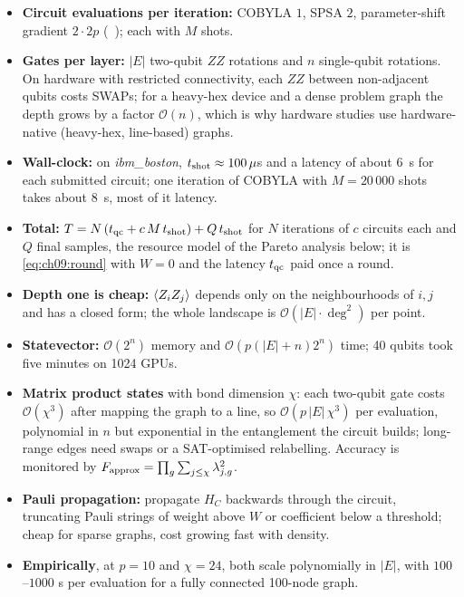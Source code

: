 \documentclass[handoutsbeamer.tex]{subfiles}
\begin{document}
\begin{frame}
\begin{itemize}\setlength\itemsep{0.3em}
    \item \textbf{Circuit evaluations per iteration:} COBYLA $1$, SPSA $2$, parameter-shift gradient $2\cdot 2p$ (\Chap~); each with $M$ shots.
    \item \textbf{Gates per layer:} $|E|$ two-qubit $ZZ$ rotations and $n$ single-qubit rotations. On hardware with restricted connectivity, each $ZZ$ between non-adjacent qubits costs SWAPs; for a heavy-hex device and a dense problem graph the depth grows by a factor $\mathcal O(n)$, which is why hardware studies use hardware-native (heavy-hex, line-based) graphs.
    \item \textbf{Wall-clock:} on \emph{ibm\_boston}, $t_{\rm shot} \approx 100\,\mu$s and a latency of about $6$~s for each submitted circuit; one iteration of COBYLA with $M = 20\,000$ shots takes about $8$~s, most of it latency.
    \item \textbf{Total:} $T = N\,(t_{\rm qc} + c\,M\,t_{\rm shot}) + Q\,t_{\rm shot}$ for $N$ iterations of $c$ circuits each and $Q$ final samples, the resource model of the Pareto analysis below; it is \eqref{eq:ch09:round} with $W = 0$ and the latency $t_{\rm qc}$ paid once a round.
\end{itemize}
\end{frame}

\begin{frame}
\begin{itemize}\setlength\itemsep{0.3em}
    \item \textbf{Depth one is cheap:} $\braket{Z_iZ_j}$ depends only on the neighbourhoods of $i,j$ and has a closed form; the whole landscape is $\mathcal O(|E|\cdot\deg^2)$ per point.
    \item \textbf{Statevector:} $\mathcal O(2^n)$ memory and $\mathcal O(p(|E|+n)2^n)$ time; 40 qubits took five minutes on 1024 GPUs.
    \item \textbf{Matrix product states} with bond dimension $\chi$: each two-qubit gate costs $\mathcal O(\chi^3)$ after mapping the graph to a line, so $\mathcal O(p\,|E|\,\chi^3)$ per evaluation, polynomial in $n$ but exponential in the entanglement the circuit builds; long-range edges need swaps or a SAT-optimised relabelling. Accuracy is monitored by $F_{\rm approx} = \prod_g\sum_{j\le\chi}\lambda_{j,g}^2$.
    \item \textbf{Pauli propagation:} propagate $H_C$ backwards through the circuit, truncating Pauli strings of weight above $W$ or coefficient below a threshold; cheap for sparse graphs, cost growing fast with density.
    \item \textbf{Empirically}, at $p = 10$ and $\chi = 24$, both scale polynomially in $|E|$, with $100$--$1000$ s per evaluation for a fully connected 100-node graph.
\end{itemize}
\end{frame}
\end{document}
